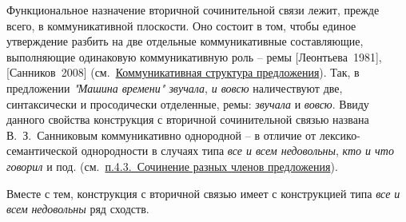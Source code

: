 Функциональное назначение вторичной сочинительной связи лежит, прежде
всего, в коммуникативной плоскости. Оно состоит в том, чтобы единое
утверждение разбить на две отдельные коммуникативные составляющие,
выполняющие одинаковую коммуникативную роль -- ремы
{[}Леонтьева~1981{]}, {[}Санников~2008{]}
(см.~\underline{Коммуникативная структура предложения}). Так, в
предложении \emph{"Машина времени" звучала}, \emph{и вовсю} наличествуют
две, синтаксически и просодически отделенные, ремы: \emph{звучала} и
\emph{вовсю}. Ввиду данного свойства конструкция с вторичной
сочинительной связью названа В.~З.~Санниковым коммуникативно однородной
-- в отличие от лексико-семантической однородности в случаях типа
\emph{все и всем недовольны}, \emph{кто и что говорил} и под.
(см.~\underline{п.4.3.~Сочинение разных членов предложения}).

Вместе с тем, конструкция с вторичной связью имеет с конструкцией типа
\emph{все и всем} \emph{недовольны} ряд сходств.

